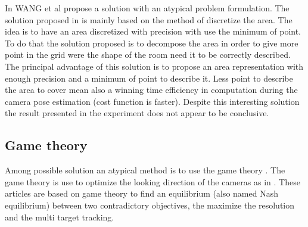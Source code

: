 	
In WANG et al \cite{181*wang2017} propose a solution with an atypical problem formulation. The solution proposed in \cite{181*wang2017} is mainly based on the method of discretize the area. The idea is to have an area discretized with precision with use the minimum of point. To do that the solution proposed is to decompose the area in order to give more point in the grid were the shape of the room need it to be correctly described. \\
The principal advantage of this solution is to propose an area representation with enough precision and a minimum of point to describe it. Less point to describe the area to cover mean also a winning time efficiency in computation during the camera pose estimation (cost function is faster).
Despite this interesting solution the result presented in the experiment does not appear to be conclusive. \\
	
\subsection{Game theory} 
	 
Among possible solution an atypical method is to use the game theory \cite{19*li2013}. The game theory is use to optimize the looking direction of the cameras as in \cite{12*soto2009,18*ding2012,19*li2013,25*song2008}. These articles are based on game theory to find an equilibrium (also named Nash equilibrium) between two contradictory objectives, the maximize the resolution and the multi target tracking.\\

